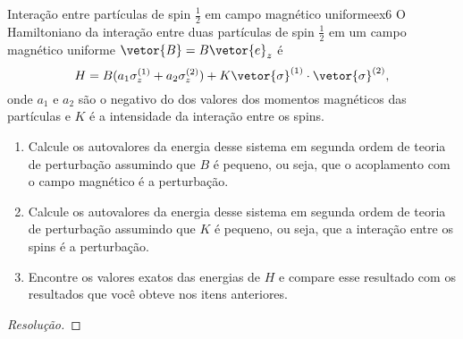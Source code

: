 \begin{exercício}{Interação entre partículas de spin \(\frac12\) em campo magnético uniforme}{ex6}
   O Hamiltoniano da interação entre duas partículas de spin \(\frac12\) em um campo magnético uniforme \(\vetor{B} = B \vetor{e}_z\) é
   \begin{equation*}
      H = B (a_1 \sigma_z^{(1)} + a_2 \sigma_z^{(2)}) + K \vetor{\sigma}^{(1)} \cdot \vetor{\sigma}^{(2)},
   \end{equation*}
   onde \(a_1\) e \(a_2\) são o negativo do dos valores dos momentos magnéticos das partículas e \(K\) é a intensidade da interação entre os spins.
   \begin{enumerate}[label=(\alph*)]
       \item Calcule os autovalores da energia desse sistema em segunda ordem de teoria de perturbação assumindo que \(B\) é pequeno, ou seja, que o acoplamento com o campo magnético é a perturbação.
       \item Calcule os autovalores da energia desse sistema em segunda ordem de teoria de perturbação assumindo que \(K\) é pequeno, ou seja, que a interação entre os spins é a perturbação.
       \item Encontre os valores exatos das energias de \(H\) e compare esse resultado com os resultados que você obteve nos itens anteriores.
   \end{enumerate}
\end{exercício}
\begin{proof}[Resolução]
    
\end{proof}
